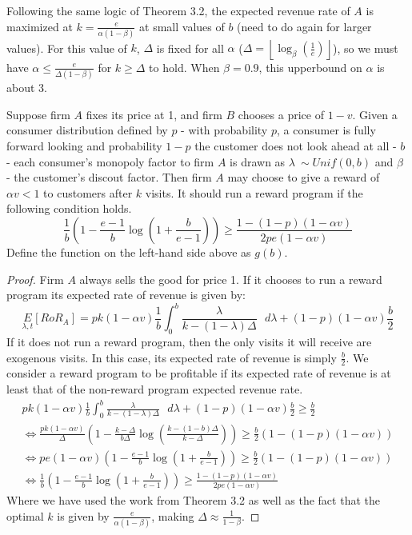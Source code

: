 Following the same logic of Theorem 3.2, the expected revenue rate of $A$ is maximized at $k = \frac{e}{\alpha(1-\beta)}$ at small values of $b$ (need to do again for larger values). For this value of $k$, $\Delta$ is fixed for all $\alpha$ ($\Delta = \left \lfloor \log_{\beta} \left(\frac{1}{e} \right) \right \rfloor$), so we must have $\alpha \leq \frac{e}{\Delta(1-\beta)}$ for $k \geq \Delta$ to hold. When $\beta = 0.9$, this upperbound on $\alpha$ is about 3.


\begin{theorem}
Suppose firm $A$ fixes its price at 1, and firm $B$ chooses a price of $1-v$. Given a consumer distribution defined by $p$ - with probability $p$, a consumer is fully forward looking and probability $1-p$ the customer does not look ahead at all - $b$ - each consumer's monopoly factor to firm $A$ is drawn as $\lambda~\sim Unif(0,b)$ and $\beta$ - the customer's discout factor. Then firm $A$ may choose to give a reward of $\alpha v < 1$ to customers after $k$ visits. It should run a reward program if the following condition holds.
\begin{equation}
\frac{1}{b}\left(1-\frac{e-1}{b}\log \left(1+\frac{b}{e-1} \right) \right) \geq \frac{1-(1-p)(1-\alpha v)}{2pe(1-\alpha v)}
\end{equation}
Define the function on the left-hand side above as $g(b)$.
\end{theorem}

\begin{proof}
Firm $A$ always sells the good for price 1. If it chooses to run a reward program its expected rate of revenue is given by:
\begin{equation*}
\underset{\lambda, t}E[RoR_A] = pk(1-\alpha v)\frac{1}{b}\int_0^b \frac{\lambda}{k-(1-\lambda)\Delta} \mbox{ } d\lambda + (1-p)(1-\alpha v)\frac{b}{2}
\end{equation*}
If it does not run a reward program, then the only visits it will receive are exogenous visits. In this case, its expected rate of revenue is simply $\frac{b}{2}$. We consider a reward program to be profitable if its expected rate of revenue is at least that of the non-reward program expected revenue rate.
\begin{gather*}
pk(1-\alpha v)\frac{1}{b}\int_0^b \frac{\lambda}{k-(1-\lambda)\Delta} \mbox{ } d\lambda + (1-p)(1-\alpha v)\frac{b}{2} \geq \frac{b}{2} \\
\iff \frac{pk(1-\alpha v)}{\Delta}\left(1-\frac{k-\Delta}{b\Delta}\log \left(\frac{k-(1-b)\Delta}{k-\Delta} \right) \right) \geq \frac{b}{2}(1-(1-p)(1-\alpha v)) \\
\iff pe(1-\alpha v)\left(1-\frac{e-1}{b}\log \left(1+\frac{b}{e-1} \right) \right) \geq \frac{b}{2}(1-(1-p)(1-\alpha v)) \\
\iff \frac{1}{b}\left(1-\frac{e-1}{b}\log \left(1+\frac{b}{e-1} \right) \right) \geq \frac{1-(1-p)(1-\alpha v)}{2pe(1-\alpha v)}
\end{gather*}
Where we have used the work from Theorem 3.2 as well as the fact that the optimal $k$ is given by $\frac{e}{\alpha(1-\beta)}$, making $\Delta \approx \frac{1}{1-\beta}$. 
\end{proof}

